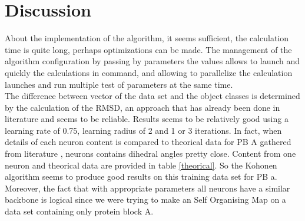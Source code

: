 \documentclass[11pt,a4paper]{article}
\begin{document}
    
    \section{Discussion}
    
    About the implementation of the algorithm, it seems sufficient, the calculation time is quite long, perhaps optimizations can be made. The management of the algorithm configuration by passing by parameters the values allows to launch and quickly the calculations in command, and allowing to parallelize the calculation launches and run multiple test of parameters at the same time. \\
    
    The difference between vector of the data set and the object classes is determined by the calculation of the RMSD, an approach that has already been done in literature \cite{brevern_etchebest_hazout_2000} \cite{schuchhardt_schneider_reichelt_schomburg_wrede_1996} and seems to be reliable. 
    Results seems to be relatively good using a learning rate of 0.75, learning radius of 2 and 1 or 3 iterations. In fact, when details of each neuron content is compared to theorical data for PB A gathered from literature \cite{article}, neurons contains dihedral angles pretty close. Content from one neuron and theorical data are provided in table \ref{theorical}. So the Kohonen algorithm seems to produce good results on this training data set for PB a. Moreover, the fact that with appropriate parameters all neurons have a similar backbone is logical since we were trying to make an Self Organising Map on a data set containing only protein block A. \\
    
\end{document}
